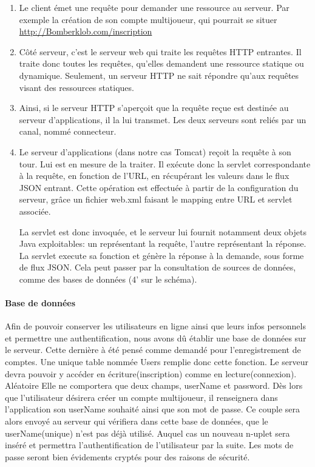 		\begin{enumerate}

			\item 
					Le client émet une requête pour demander une
					ressource au serveur. Par exemple la création de son compte multijoueur,
					qui pourrait se situer \url{http://Bomberklob.com/inscription}
			\item
					Côté serveur, c'est le serveur web qui traite les
					requêtes HTTP entrantes. Il traite donc toutes les requêtes, qu'elles
					demandent une ressource statique ou dynamique. Seulement, un serveur HTTP
					ne sait répondre qu'aux requêtes visant des ressources statiques.

			\item 
					Ainsi, si le serveur HTTP s'aperçoit que la requête reçue est destinée
					au serveur d'applications, il la lui transmet. Les deux serveurs sont
					reliés par un canal, nommé connecteur.
		
			\item
					Le serveur d'applications (dans notre cas Tomcat) reçoit la requête à
					son tour. Lui est en mesure de la traiter. Il exécute donc la servlet
					correspondante à la requête, en fonction de l'URL, en récupérant les
					valeurs dans le flux JSON entrant. Cette opération est effectuée à partir
					de la configuration du serveur, grâce un fichier web.xml faisant le mapping
					entre URL et servlet associée.
		
					La servlet est donc invoquée, et le serveur lui fournit notamment deux
					objets Java exploitables: un représentant la requête, l'autre représentant
					la réponse. La servlet execute sa fonction et génère la réponse à la
					demande, sous forme de flux JSON. Cela peut passer par la consultation de
					sources de données, comme des bases de données (4' sur le schéma).		
		
		\end{enumerate}
		
	\paragraph{Base de données\\}
		Afin de pouvoir conserver les utilisateurs en ligne ainsi que leurs infos
		personnels et permettre une authentification, nous avons dû établir une
		base de données sur le serveur. Cette dernière à été pensé comme demandé pour 
		l'enregistrement de comptes. Une unique table nommée Users remplie donc cette
		fonction. Le serveur devra pouvoir y accéder en écriture(inscription) comme
		en lecture(connexion).
			Aléatoire
		Elle ne comportera que deux champs, userName et password. Dès lors que
		l'utilisateur désirera créer un compte multijoueur, il renseignera dans
		l'application son userName souhaité ainsi que son mot de passe. 
		Ce couple sera 	alors envoyé au serveur qui vérifiera dans cette base de
		données, que le userName(unique) n'est pas déjà utilisé. Auquel cas un nouveau n-uplet sera
		inséré et permettra l'authentification de l'utilisateur par la suite. Les mots
		de passe seront bien évidements cryptés pour des raisons de sécurité.
			

		\newpage
		
	


